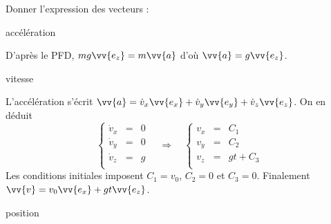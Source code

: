 Donner l'expression des vecteurs :


\debutEntrainement

\begin{enonce}
	 accélération
\end{enonce}


\begin{corrige}
  D'après le PFD, $mg\vv{e_z}=m\vv{a}$ d'où $\vv{a}=g \vv{e_z}$.
\end{corrige}



\begin{enonce}
	 vitesse
\end{enonce}


\begin{corrige}
  L'accélération s'écrit $\vv{a}=\dot{v}_x\vv{e_x}+\dot{v}_y\vv{e_y}+\dot{v}_z\vv{e_z}$. On en déduit 
  \[
  	\left\{
	\begin{array}{ccc}
  		\dot{v}_x&=&0\\
  		\dot{v}_y&=&0\\
  		\dot{v}_z&=&g\\
  	\end{array}
	\right.
	\quad\Rightarrow\quad
  	\left\{
	\begin{array}{ccc}
  		v_x&=&C_1\\
  		v_y&=&C_2\\
  		v_z&=&gt+C_3\\
  	\end{array}
	\right.
  \]
  Les conditions initiales imposent $C_1=v_0$, $C_2=0$ et $C_3=0$. Finalement $\vv{v}=v_0 \vv{e_x} + g t \vv{e_z} $.
\end{corrige}



\begin{enonce}
	 position
\end{enonce}

